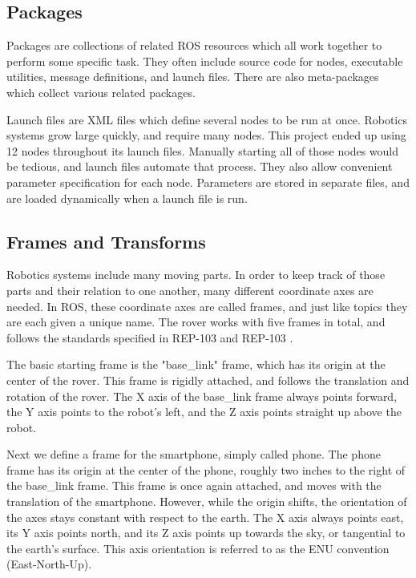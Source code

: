 \subsection{Packages}
Packages are collections of related ROS resources which all work together to perform some specific task. They often include source code for nodes, executable utilities, message definitions, and launch files. There are also meta-packages which collect various related packages.

Launch files are XML files which define several nodes to be run at once. Robotics systems grow large quickly, and require many nodes. This project ended up using 12 nodes throughout its launch files. Manually starting all of those nodes would be tedious, and launch files automate that process. They also allow convenient parameter specification for each node. Parameters are stored in separate files, and are loaded dynamically when a launch file is run.

\subsection{Frames and Transforms}

Robotics systems include many moving parts. In order to keep track of those parts and their relation to one another, many different coordinate axes are needed. In ROS, these coordinate axes are called frames, and just like topics they are each given a unique name. The rover works with five frames in total, and follows the standards specified in REP-103 and REP-103 \cite{REP-103} \cite{REP-105}.


The basic starting frame is the "base\_link" frame, which has its origin at the center of the rover. This frame is rigidly attached, and follows the translation and rotation of the rover. The X axis of the base\_link frame always points forward, the Y axis points to the robot's left, and the Z axis points straight up above the robot.

Next we define a frame for the smartphone, simply called phone. The phone frame has its origin at the center of the phone, roughly two inches to the right of the base\_link frame. This frame is once again attached, and moves with the translation of the smartphone. However, while the origin shifts, the orientation of the axes stays constant with respect to the earth. The X axis always points east, its Y axis points north, and its Z axis points up towards the sky, or tangential to the earth's surface. This axis orientation is referred to as the ENU convention (East-North-Up).

